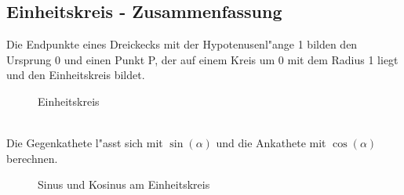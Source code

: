 \documentclass{standalone}
\begin{document}
\subsection{Einheitskreis - Zusammenfassung}
\noindent Die Endpunkte eines Dreickecks mit der Hypotenusenl{"a}nge 1 bilden den Ursprung 0 und einen Punkt P, der auf einem Kreis um 0 mit dem Radius 1 liegt und den Einheitskreis bildet.
\vspace{-0.3cm}  %
\begin{figure}[hb!]
  \center
  \def\svgwidth{150px}
  
  \caption{Einheitskreis}
  \label{fig:0_alpha_90_360}
\end{figure}
\\\noindent Die Gegenkathete l{"a}sst sich mit $\sin(\alpha)$ und die Ankathete mit $\cos(\alpha)$ berechnen. 
\vspace{-0.3cm}  %
\begin{figure}[hb!]
	\centering
	\def\svgwidth{150px}
	
	\caption{Sinus und Kosinus am Einheitskreis}
	\label{fig:sin_cos_einheitskreis}
\end{figure}
\end{document}
